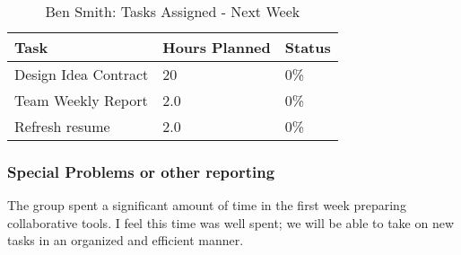 \documentclass[12pt,article,compsoc]{IEEEtran}
\begin{document}
	\begin{table}[ht]
	\renewcommand{\arraystretch}{1.3}
		\caption{Ben Smith: Tasks Assigned - Next Week}
		
		\label{Summary of Ben Smith's activites: this week}
		
		\centering
		\begin{tabular}{p{5.5cm}|p{1cm}|p{1cm}}

		\hline
		\bfseries 		Task		 				& \bfseries Hours Planned		& \bfseries Status		\\
		\hline\hline
					Design Idea Contract			& 20						& 0\%				\\	%
					Team Weekly Report			& 2.0						& 0\%				\\	
					Refresh resume 			& 2.0						& 0\%				\\
		\hline
		\end{tabular}
	\end{table}

	\subsubsection*{Special Problems or other reporting}
	The group spent a significant amount of time in the first week preparing collaborative tools. I feel this time was well spent; 
	we will be able to take on new tasks in an organized and efficient manner. 	
	
\end{document}
